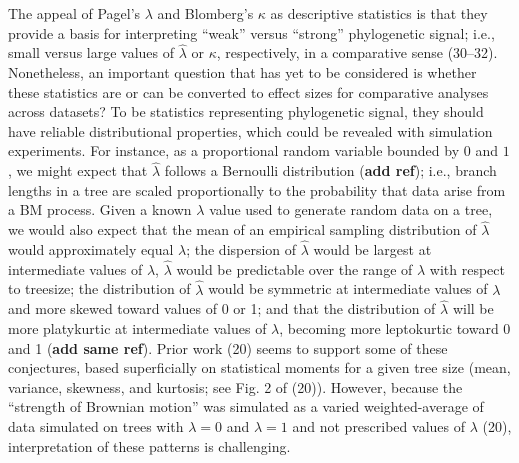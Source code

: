 \documentclass[
]{article}
\begin{document}
The appeal of Pagel's \(\lambda\) and Blomberg's \(\kappa\) as
descriptive statistics is that they provide a basis for interpreting
``weak'' versus ``strong'' phylogenetic signal; i.e., small versus large
values of \(\hat{\lambda}\) or \(\kappa\), respectively, in a
comparative sense (30--32). Nonetheless, an important question that has
yet to be considered is whether these statistics are or can be converted
to effect sizes for comparative analyses across datasets? To be
statistics representing phylogenetic signal, they should have reliable
distributional properties, which could be revealed with simulation
experiments. For instance, as a proportional random variable bounded by
\(0\) and \(1\), we might expect that \(\hat{\lambda}\) follows a
Bernoulli distribution (\textbf{add ref}); i.e., branch lengths in a
tree are scaled proportionally to the probability that data arise from a
BM process. Given a known \(\lambda\) value used to generate random data
on a tree, we would also expect that the mean of an empirical sampling
distribution of \(\hat{\lambda}\) would approximately equal \(\lambda\);
the dispersion of \(\hat{\lambda}\) would be largest at intermediate
values of \(\lambda\), \(\hat{\lambda}\) would be predictable over the
range of \(\lambda\) with respect to treesize; the distribution of
\(\hat{\lambda}\) would be symmetric at intermediate values of
\(\lambda\) and more skewed toward values of 0 or 1; and that the
distribution of \(\hat{\lambda}\) will be more platykurtic at
intermediate values of \(\lambda\), becoming more leptokurtic toward 0
and 1 (\textbf{add same ref}). Prior work (20) seems to support some of
these conjectures, based superficially on statistical moments for a
given tree size (mean, variance, skewness, and kurtosis; see Fig. 2 of
(20)). However, because the ``strength of Brownian motion'' was
simulated as a varied weighted-average of data simulated on trees with
\(\lambda=0\) and \(\lambda=1\) and not prescribed values of \(\lambda\)
(20), interpretation of these patterns is challenging. \hfill\break
\end{document}
